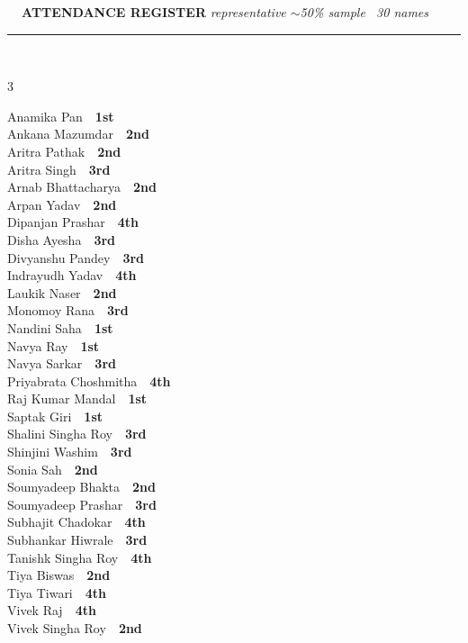\documentclass[11pt,a4paper]{article}
\begin{document}
\vspace{3pt}\noindent
{\footnotesize\bfseries\color{Slate}\faListOl~~ATTENDANCE REGISTER}%
\hfill{\scriptsize\itshape\color{Slate}representative $\sim$50\% sample \textperiodcentered\ 30 names}\\[3pt]
{\color{Line}\rule{\linewidth}{0.5pt}}\\[5pt]
\begingroup\footnotesize\setlength{\columnsep}{20pt}\setlength{\parskip}{1pt}%
\begin{multicols}{3}\raggedright
Anamika Pan~\dotfill~\textbf{1st}\\
Ankana Mazumdar~\dotfill~\textbf{2nd}\\
Aritra Pathak~\dotfill~\textbf{2nd}\\
Aritra Singh~\dotfill~\textbf{3rd}\\
Arnab Bhattacharya~\dotfill~\textbf{2nd}\\
Arpan Yadav~\dotfill~\textbf{2nd}\\
Dipanjan Prashar~\dotfill~\textbf{4th}\\
Disha Ayesha~\dotfill~\textbf{3rd}\\
Divyanshu Pandey~\dotfill~\textbf{3rd}\\
Indrayudh Yadav~\dotfill~\textbf{4th}\\
Laukik Naser~\dotfill~\textbf{2nd}\\
Monomoy Rana~\dotfill~\textbf{3rd}\\
Nandini Saha~\dotfill~\textbf{1st}\\
Navya Ray~\dotfill~\textbf{1st}\\
Navya Sarkar~\dotfill~\textbf{3rd}\\
Priyabrata Choshmitha~\dotfill~\textbf{4th}\\
Raj Kumar Mandal~\dotfill~\textbf{1st}\\
Saptak Giri~\dotfill~\textbf{1st}\\
Shalini Singha Roy~\dotfill~\textbf{3rd}\\
Shinjini Washim~\dotfill~\textbf{3rd}\\
Sonia Sah~\dotfill~\textbf{2nd}\\
Soumyadeep Bhakta~\dotfill~\textbf{2nd}\\
Soumyadeep Prashar~\dotfill~\textbf{3rd}\\
Subhajit Chadokar~\dotfill~\textbf{4th}\\
Subhankar Hiwrale~\dotfill~\textbf{3rd}\\
Tanishk Singha Roy~\dotfill~\textbf{4th}\\
Tiya Biswas~\dotfill~\textbf{2nd}\\
Tiya Tiwari~\dotfill~\textbf{4th}\\
Vivek Raj~\dotfill~\textbf{4th}\\
Vivek Singha Roy~\dotfill~\textbf{2nd}\\
\end{multicols}
\endgroup
\end{document}
